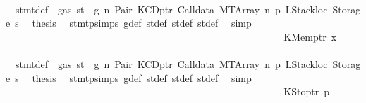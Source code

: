 \begin{isabellebody}
\ \ \ \ \ \ \ \ \ \ \ \ \ \ \ \ \ \ \ \ \ \ \ \ \ \ \ \ \isamarkupfalse%
\ {}{\isacharparenleft}{\kern0pt}{}{\isacharparenright}{\kern0pt}\ stmt{\isacharunderscore}{\kern0pt}def\ {\isacharbackquoteopen}{\isasymnot}\ gas\ st\ {\isasymle}\ g{\isacharbackquoteclose}\ n\ Pair\ KCDptr\ Calldata\ MTArray\ n{}\ p{}\ LStackloc\ Storage\ s{}\ \isamarkupfalse%
\ {\isacharquery}{\kern0pt}thesis\ \isamarkupfalse%
\ stmt{\isachardot}{\kern0pt}psimps{\isacharparenleft}{\kern0pt}{}{\isacharparenright}{\kern0pt}\ g{\isacharunderscore}{\kern0pt}def\ st{\isacharprime}{\kern0pt}{\isacharunderscore}{\kern0pt}def\ st{\isacharprime}{\kern0pt}{\isacharprime}{\kern0pt}{\isacharunderscore}{\kern0pt}def\ st{\isacharprime}{\kern0pt}{\isacharprime}{\kern0pt}{\isacharprime}{\kern0pt}{\isacharunderscore}{\kern0pt}def\ \isamarkupfalse%
\ simp\isanewline
\ \ \ \ \ \ \ \ \ \ \ \ \ \ \ \ \ \ \ \ \ \ \ \ \ \ \isamarkupfalse%
\isanewline
\ \ \ \ \ \ \ \ \ \ \ \ \ \ \ \ \ \ \ \ \ \ \ \ \ \ \ \ \isamarkupfalse%
\ {\isacharparenleft}{\kern0pt}KMemptr\ x{}{\isacharparenright}{\kern0pt}\isanewline
\ \ \ \ \ \ \ \ \ \ \ \ \ \ \ \ \ \ \ \ \ \ \ \ \ \ \ \ \isamarkupfalse%
\ {}{\isacharparenleft}{\kern0pt}{}{\isacharparenright}{\kern0pt}\ stmt{\isacharunderscore}{\kern0pt}def\ {\isacharbackquoteopen}{\isasymnot}\ gas\ st\ {\isasymle}\ g{\isacharbackquoteclose}\ n\ Pair\ KCDptr\ Calldata\ MTArray\ n{}\ p{}\ LStackloc\ Storage\ s{}\ \isamarkupfalse%
\ {\isacharquery}{\kern0pt}thesis\ \isamarkupfalse%
\ stmt{\isachardot}{\kern0pt}psimps{\isacharparenleft}{\kern0pt}{}{\isacharparenright}{\kern0pt}\ g{\isacharunderscore}{\kern0pt}def\ st{\isacharprime}{\kern0pt}{\isacharunderscore}{\kern0pt}def\ st{\isacharprime}{\kern0pt}{\isacharprime}{\kern0pt}{\isacharunderscore}{\kern0pt}def\ st{\isacharprime}{\kern0pt}{\isacharprime}{\kern0pt}{\isacharprime}{\kern0pt}{\isacharunderscore}{\kern0pt}def\ \isamarkupfalse%
\ simp\isanewline
\ \ \ \ \ \ \ \ \ \ \ \ \ \ \ \ \ \ \ \ \ \ \ \ \ \ \isamarkupfalse%
\isanewline
\ \ \ \ \ \ \ \ \ \ \ \ \ \ \ \ \ \ \ \ \ \ \ \ \ \ \ \ \isamarkupfalse%
\ {\isacharparenleft}{\kern0pt}KStoptr\ p{\isacharprime}{\kern0pt}{\isacharparenright}{\kern0pt}\isanewline
\ \ \ \ \ \ \ \ \ \ \ \ \ \ \ \ \ \ \ \ \ \ \ \ \ \ \ \ \isamarkupfalse%

\end{isabellebody}
